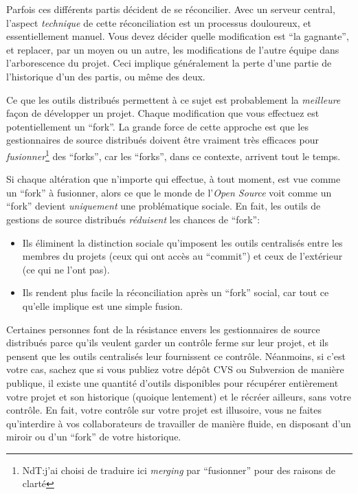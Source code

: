 Parfois ces différents partis décident de se réconcilier. Avec un 
serveur central, l'aspect \emph{technique} de cette réconciliation
est un processus douloureux, et essentiellement manuel. Vous devez
décider quelle modification est ``la gagnante'', et replacer, par un
moyen ou un autre, les modifications de l'autre équipe dans l'arborescence
du projet. Ceci implique généralement la perte d'une partie de l'historique 
d'un des partis, ou même des deux.

Ce que les outils distribués permettent à ce sujet est probablement
la \emph{meilleure} façon de développer un projet. Chaque modification
que vous effectuez est potentiellement un ``fork''. La grande force de 
cette approche est que les gestionnaires de source distribués doivent être
vraiment très efficaces pour \emph{fusionner}\footnote{NdT:j'ai choisi de
traduire ici \textit{merging} par ``fusionner'' pour des raisons de clarté}
des ``forks'', car les ``forks'', dans ce contexte, arrivent tout le
temps.

Si chaque altération que n'importe qui effectue, à tout moment, est vue
comme un ``fork'' à fusionner, alors ce que le monde de l'\textit{Open 
Source} voit comme un ``fork'' devient \emph{uniquement} une problématique 
sociale. En fait, les outils de gestions de source distribués \emph{réduisent} 
les chances de ``fork'':
\begin{itemize}
\item Ils éliminent la distinction sociale qu'imposent les outils centralisés
	entre les membres du projets (ceux qui ont accès au ``commit'') et ceux de l'extérieur (ce qui ne l'ont pas).
\item Ils rendent plus facile la réconciliation après un ``fork'' social, car
	tout ce qu'elle implique est une simple fusion.
\end{itemize}

Certaines personnes font de la résistance envers les gestionnaires de source
distribués parce qu'ils veulent garder un contrôle ferme sur leur projet, et
ils pensent que les outils centralisés leur fournissent ce contrôle. Néanmoins,
si c'est votre cas, sachez que si vous publiez votre dépôt CVS ou Subversion
de manière publique, il existe une quantité d'outils disponibles pour récupérer
entièrement votre projet et son historique (quoique lentement) et le récréer 
ailleurs, sans votre contrôle. En fait, votre contrôle sur votre projet est 
illusoire, vous ne faites qu'interdire à vos collaborateurs de travailler
de manière fluide, en disposant d'un miroir ou d'un ``fork'' de votre
historique.

